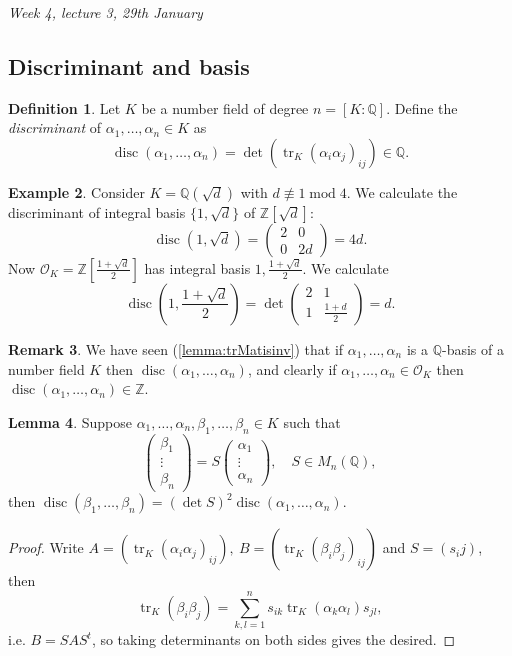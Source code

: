 \documentclass{article}
\newcommand{\Z}{\mathbb{Z}}
\newcommand{\Q}{\mathbb{Q}}
\newcommand{\tr}{\operatorname{tr}}
\newcommand{\Mod}{\operatorname{mod}}
\newcommand{\disc}{\operatorname{disc}}
\newcommand{\ri}{\mathcal{O}}
\theoremstyle{definition}
\newtheorem{defn}{Definition}[subsection]
\newtheorem{lemma}[defn]{Lemma}
\newtheorem{example}[defn]{Example}
\newtheorem{remark}[defn]{Remark}
\begin{document}
\begin{flushright}
\textit{Week 4, lecture 3, 29th January}
\end{flushright}

\subsection{Discriminant and basis}

\begin{defn}
Let $K$ be a number field of degree $n=[K:\Q]$. Define the \textit{discriminant} of $\alpha_1,\ldots,\alpha_n\in K$ as
\[
\disc(\alpha_1,\ldots,\alpha_n)=\det (\tr_K(\alpha_i\alpha_j)_{ij})\in\Q.
\]
\end{defn}

\begin{example}
Consider $K=\Q\left(\sqrt d\right)$ with $d\not\equiv 1\Mod 4$. We calculate the discriminant of integral basis $\{1,\sqrt d\}$ of $\Z\left[\sqrt d\right]$:
\[
\disc\left(1,\sqrt d\right)=\begin{pmatrix}
2 & 0 \\ 0 & 2d
\end{pmatrix}=4d.
\]
Now $\ri_K=\Z\left[\frac{1+\sqrt d}{2}\right]$ has integral basis $1,\frac{1+\sqrt d}{2}$. We calculate
\[
\disc\left(1,\frac{1+\sqrt d}{2}\right)=\det\begin{pmatrix}
2 & 1 \\ 1 & \frac{1+d}{2}
\end{pmatrix}=d.
\]
\end{example}

\begin{remark}
We have seen (\ref{lemma:trMatisinv}) that if $\alpha_1,\ldots,\alpha_n$ is a $\Q$-basis of a number field $K$ then $\disc(\alpha_1,\ldots,\alpha_n)$, and clearly if $\alpha_1,\ldots,\alpha_n\in\ri_K$ then $\disc(\alpha_1,\ldots,\alpha_n)\in\Z$.
\end{remark}

\begin{lemma}
Suppose $\alpha_1,\ldots,\alpha_n,\beta_1,\ldots,\beta_n\in K$ such that
\[
\begin{pmatrix}
\beta_1 \\ \vdots \\ \beta_n
\end{pmatrix}=S\begin{pmatrix}
\alpha_1 \\ \vdots \\ \alpha_n
\end{pmatrix},\quad S\in M_n(\Q),
\]
then $\disc(\beta_1,\ldots,\beta_n)=(\det S)^2\disc(\alpha_1,\ldots,\alpha_n)$.
\end{lemma}
\begin{proof}
Write $A=(\tr_K(\alpha_i\alpha_j)_{ij}),\ B=(\tr_K(\beta_i\beta_j)_{ij})$ and $S=(s_ij)$, then
\[
\tr_K(\beta_i\beta_j)=\sum_{k,l=1}^n s_{ik}\tr_K(\alpha_k\alpha_l)s_{jl},
\]
i.e. $B=SAS^t$, so taking determinants on both sides gives the desired.
\end{proof}
\end{document}
